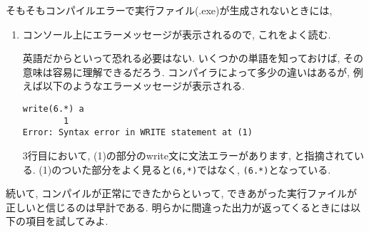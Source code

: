 そもそもコンパイルエラーで実行ファイル(.exe)が生成されないときには,  
\begin{enumerate}
\item コンソール上にエラーメッセージが表示されるので, これをよく読む. 

英語だからといって恐れる必要はない. いくつかの単語を知っておけば, その意味は容易に理解できるだろう. 
コンパイラによって多少の違いはあるが, 例えば以下のようなエラーメッセージが表示される. 
\begin{Verbatim}[frame=single]
 write(6.*) a
        1
Error: Syntax error in WRITE statement at (1)
\end{Verbatim}
3行目において, (1)の部分のwrite文に文法エラーがあります, と指摘されている. 
(1)のついた部分をよく見ると\verb|(6,*)|ではなく, \verb|(6.*)|となっている. 
\end{enumerate}

続いて, コンパイルが正常にできたからといって, できあがった実行ファイルが正しいと信じるのは早計である. 
明らかに間違った出力が返ってくるときには以下の項目を試してみよ. 

